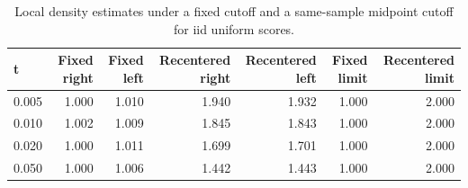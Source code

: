 \begin{table}[!htbp]
\centering
\caption{Local density estimates under a fixed cutoff and a same-sample midpoint cutoff for iid uniform scores.}
\label{tab:mechanical-density-simulation}
\begin{tabular}{lrrrrrr}
\toprule
t & Fixed right & Fixed left & Recentered right & Recentered left & Fixed limit & Recentered limit \\
\midrule
0.005 & 1.000 & 1.010 & 1.940 & 1.932 & 1.000 & 2.000 \\
0.010 & 1.002 & 1.009 & 1.845 & 1.843 & 1.000 & 2.000 \\
0.020 & 1.000 & 1.011 & 1.699 & 1.701 & 1.000 & 2.000 \\
0.050 & 1.000 & 1.006 & 1.442 & 1.443 & 1.000 & 2.000 \\
\bottomrule
\end{tabular}
\end{table}

